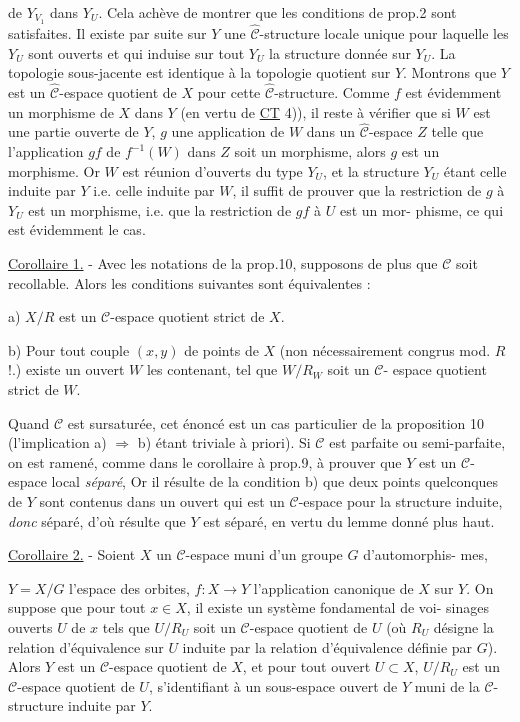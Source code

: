 de $Y_{V_1}$ dans $Y_U$. Cela achève de montrer que les conditions de prop.2 sont
satisfaites. Il existe par suite sur $Y$ une $\hat{\mathcal{C}}$-structure locale unique pour
laquelle les $Y_U$ sont ouverts et qui induise sur tout $Y_U$ la structure
donnée sur $Y_U$. La topologie sous-jacente est identique à la topologie
quotient sur $Y$. Montrons que $Y$ est un $\hat{\mathcal{C}}$-espace quotient de $X$ pour
cette $\hat{\mathcal{C}}$-structure. Comme $f$ est évidemment un morphisme de $X$ dans $Y$
(en vertu de \underline{CT} 4)), il reste à vérifier que si $W$ est une partie ouverte
de $Y$, $g$ une application de $W$ dans un $\hat{\mathcal{C}}$-espace $Z$ telle que l'application
$gf$ de $f^{-1}(W)$ dans $Z$ soit un morphisme, alors $g$ est un morphisme. Or $W$
est réunion d'ouverts du type $Y_U$, et la structure $Y_U$ étant celle induite
par $Y$ i.e. celle induite par $W$, il suffit de prouver que la restriction
de $g$ à $Y_U$ est un morphisme, i.e. que la restriction de $gf$ à $U$ est un mor-
phisme, ce qui est évidemment le cas.

\underline{Corollaire 1.} - Avec les notations de la prop.10, supposons de plus que
$\mathcal{C}$ soit recollable. Alors les conditions suivantes sont équivalentes :

a) $X/R$ est un $\mathcal{C}$-espace quotient strict de $X$.

b) Pour tout couple $(x,y)$ de points de $X$ (non nécessairement congrus
mod. $R$ !.) existe un ouvert $W$ les contenant, tel que $W/R_W$ soit un $\mathcal{C}$-
espace quotient strict de $W$.

Quand $\mathcal{C}$ est sursaturée, cet énoncé est un cas particulier de la
proposition 10 (l'implication a) $\Rightarrow$ b) étant triviale à priori). Si $\mathcal{C}$
est parfaite ou semi-parfaite, on est ramené, comme dans le corollaire à
prop.9, à prouver que $Y$ est un $\mathcal{C}$-espace local \emph{séparé}, Or il résulte de
la condition b) que deux points quelconques de $Y$ sont contenus dans un
ouvert qui est un $\mathcal{C}$-espace pour la structure induite, \emph{donc} séparé, d'où
résulte que $Y$ est séparé, en vertu du lemme donné plus haut.

\underline{Corollaire 2.} - Soient $X$ un $\mathcal{C}$-espace muni d'un groupe $G$ d'automorphis-
mes,

\newpage



$Y = X/G$ l'espace des orbites, $f:X \to Y$ l'application canonique de $X$ sur $Y$.
On suppose que pour tout $x \in X$, il existe un système fondamental de voi-
sinages ouverts $U$ de $x$ tels que $U/R_U$ soit un $\mathcal{C}$-espace quotient de $U$
(où $R_U$ désigne la relation d'équivalence sur $U$ induite par la relation
d'équivalence définie par $G$). Alors $Y$ est un $\mathcal{C}$-espace quotient de $X$, et
pour tout ouvert $U \subset X$, $U/R_U$ est un $\mathcal{C}$-espace quotient de $U$, s'identifiant
à un sous-espace ouvert de $Y$ muni de la $\mathcal{C}$-structure induite par $Y$.


